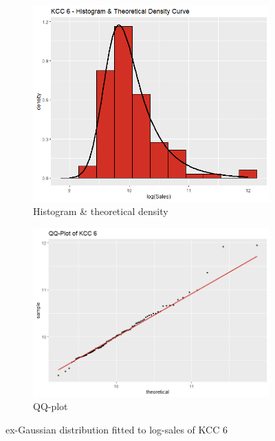  \begin{figure}[H]
\centering
\begin{subfigure}{.45\textwidth}
  \centering
  \includegraphics[width=\linewidth]{figures/kcc_6_density.png}
  \caption{Histogram \& theoretical density}
  \label{fig:kcc_6_density}
\end{subfigure}
\begin{subfigure}{.45\textwidth}
  \centering
  \includegraphics[width=\linewidth]{figures/kcc_6_qqplot.png}
  \caption{QQ-plot}
  \label{fig:kcc_6_qqplot}
\end{subfigure}
\caption{ex-Gaussian distribution fitted to log-sales of \ac{KCC} 6}
\label{fig:kcc_6_margin}
\end{figure} 


